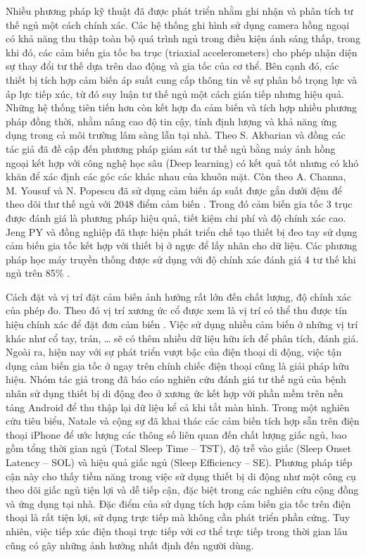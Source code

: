 Nhiều phương pháp kỹ thuật đã được phát triển nhằm ghi nhận và phân tích tư thế 
ngủ một cách chính xác. Các hệ thống ghi hình sử dụng camera hồng ngoại có khả năng 
thu thập toàn bộ quá trình ngủ trong điều kiện ánh sáng thấp, 
trong khi đó, các cảm biến gia tốc ba trục (triaxial accelerometers) 
cho phép nhận diện sự thay đổi tư thế dựa trên dao động và gia tốc của cơ thể. 
Bên cạnh đó, các thiết bị tích hợp cảm biến áp suất cung cấp thông tin về 
sự phân bố trọng lực và áp lực tiếp xúc, từ đó suy luận tư thế ngủ một cách gián tiếp 
nhưng hiệu quả. Những hệ thống tiên tiến hơn còn kết hợp đa cảm biến và 
tích hợp nhiều phương pháp đồng thời, nhằm nâng cao độ tin cậy, 
tính định lượng và khả năng ứng dụng trong cả môi trường lâm sàng lẫn tại nhà. 
Theo S. Akbarian và đồng các tác giả đã đề cập đến phương pháp giám sát tư 
thế ngủ bằng máy ảnh hồng ngoại kết hợp với công nghệ học sâu (Deep learning) 
\cite{Akbarian_osa} có kết quả tốt nhưng có khó khăn để xác định các góc các khác nhau của khuôn mặt. 
Còn theo A. Channa, M. Yousuf và N. Popescu đã sử dụng cảm biến áp suất được gắn dưới đệm để theo dõi 
thư thế ngủ với 2048 điểm cảm biến \cite{Channa_osa}. 
Trong đó cảm biến gia tốc 3 trục được đánh giá là phương pháp hiệu quả, 
tiết kiệm chi phí và độ chính xác cao. Jeng PY và đồng nghiệp đã thực hiện phát 
triển chế tạo thiết bị đeo tay sử dụng cảm biến gia tốc kết hợp với 
thiết bị ở ngực để lấy nhãn cho dữ liệu. Các phương pháp học máy truyền thống 
được sử dụng với độ chính xác đánh giá 4 tư thế khi ngủ trên 85\% \cite{Jeng_osa}. 

Cách đặt và vị trí đặt cảm biến ảnh hướng rất lớn đến chất lượng, độ chính xác của phép đo. 
Theo đó vị trí xương ức cổ được xem là vị trí có thể thu được tín hiệu chính xác để đặt 
đơn cảm biến \cite{Zhang_osa}. Việc sử dụng nhiều cảm biến ở những vị trí khác như cổ tay, trán, … 
sẽ có thêm nhiều dữ liệu hữu ích để phân tích, đánh giá. 
Ngoài ra, hiện nay với sự phát triển vượt bậc của điện thoại di động, việc tận dụng cảm biến gia tốc 
ở ngay trên chính chiếc điện thoại cũng là giải pháp hữu hiệu. 
Nhóm tác giả trong \cite{Ferrer_osa} đã báo cáo nghiên cứu đánh giá tư thế ngủ 
của bệnh nhân sử dụng thiết bị di động đeo ở xương ức kết hợp với 
phần mềm trên nền tảng Android để thu thập lại dữ liệu kể cả khi tắt màn hình. 
Trong một nghiên cứu tiêu biểu, Natale và cộng sự đã khai thác các cảm biến tích 
hợp sẵn trên điện thoại iPhone để ước lượng các thông số liên 
quan đến chất lượng giấc ngủ, bao gồm tổng thời gian ngủ (Total Sleep Time – TST), 
độ trễ vào giấc (Sleep Onset Latency – SOL) và hiệu quả giấc ngủ (Sleep Efficiency – SE). 
Phương pháp tiếp cận này cho thấy tiềm năng trong việc sử dụng thiết bị di động 
như một công cụ theo dõi giấc ngủ tiện lợi và dễ tiếp cận, đặc biệt trong các nghiên 
cứu cộng đồng và ứng dụng tại nhà\cite{Natale_osa}. Đặc điểm của sử dụng tích hợp cảm biến gia tốc 
trên điện thoại là rất tiện lợi, sử dụng trực tiếp mà không cần phát triển phần cứng. 
Tuy nhiên, việc tiếp xúc điện thoại trực tiếp với cơ thể trực tiếp trong thời gian 
lâu cũng có gây những ảnh hưởng nhất định đến người dùng.

